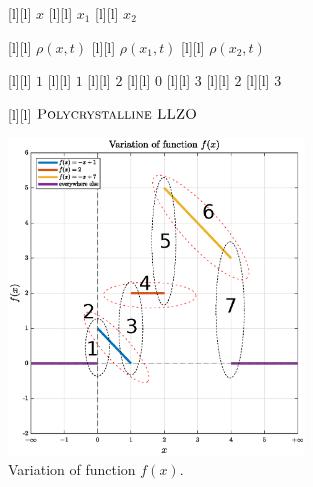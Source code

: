 \begin{figure}[ht]
	\centering
	\footnotesize

	[l] {$x$}
	[l] {$x_1$}
	[l] {$x_2$}

	[l] {$\rho(x,t)$}
	[l] {$\rho(x_{1},t)$}
	[l] {$\rho(x_{2},t)$}

	[l] {$1$}
	[l] {$1$}
	[l] {$2$}
	[l] {$0$}
	[l] {$3$}
	[l] {$2$}
	[l] {$3$}

	[l] {$\textsc{Polycrystalline LLZO}$}

	\includegraphics[width=0.7\textwidth]{totalvariation_inv.eps}
	\caption{Variation of function $f(x)$.}
	\label{\LABEL}
\end{figure}

